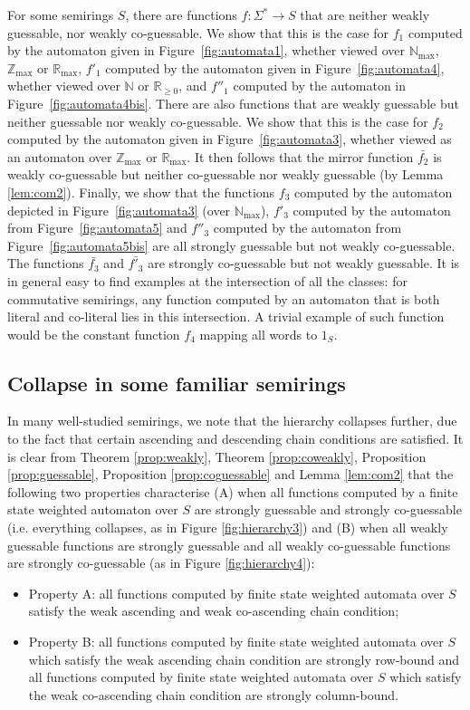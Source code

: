 \documentclass[10pt,a4paper]{amsart}
\theoremstyle{definition}
\numberwithin{equation}{section}
\numberwithin{theorem}{section}
\begin{document}
For some semirings $S$, there are functions $f: \Sigma^* \rightarrow S$ that are neither weakly guessable, nor weakly co-guessable. We show that this is the case for $f_1$ computed by the automaton given in Figure~\ref{fig:automata1}, whether viewed over $\mathbb{N}_{\max}$, $\mathbb{Z}_{\max}$ or $\mathbb{R}_{\max}$, $f'_1$ computed by the automaton given in Figure~\ref{fig:automata4}, whether viewed over $\mathbb{N}$ or $\mathbb{R}_{\geq 0}$, and $f''_1$ computed by the automaton in Figure~\ref{fig:automata4bis}. There are also functions that are weakly guessable but neither guessable nor weakly co-guessable. We show that this is the case for $f_2$ computed by the automaton given in Figure~\ref{fig:automata3}, whether viewed as an automaton over $\mathbb{Z}_{\max}$ or $\mathbb{R}_{\max}$. It then follows that the mirror function $\bar{f_2}$ is weakly co-guessable but neither co-guessable nor weakly guessable (by Lemma \ref{lem:com2}). Finally, we show that the functions $f_3$ computed by the automaton depicted in Figure~\ref{fig:automata3} (over $\mathbb{N}_{\max}$), $f'_3$ computed by the automaton from Figure~\ref{fig:automata5} and $f''_3$ computed by the automaton from Figure~\ref{fig:automata5bis} are all strongly guessable but not weakly co-guessable. The functions $\bar{f_3}$ and $\bar{f'_3}$ are strongly co-guessable but not weakly guessable. 
It is in general easy to find examples at the intersection of all the classes: for commutative semirings, any function computed by an automaton that is both literal and co-literal lies in this intersection. A trivial example of such function would be the constant function $f_4$ mapping all words to $1_S$.

\subsection{Collapse in some familiar semirings}
In many well-studied semirings, we note that the hierarchy collapses further, due to the fact that certain ascending and descending chain conditions are satisfied. It is clear from Theorem \ref{prop:weakly}, Theorem \ref{prop:coweakly}, Proposition \ref{prop:guessable}, Proposition \ref{prop:coguessable} and Lemma \ref{lem:com2} that the following two properties characterise (A) when all functions computed by a finite state weighted automaton over $S$ are strongly guessable and strongly co-guessable (i.e. everything collapses, as in Figure \ref{fig:hierarchy3}) and (B) when all weakly guessable functions are strongly guessable and all weakly co-guessable functions are strongly co-guessable (as in Figure \ref{fig:hierarchy4}):
\begin{itemize}
	\item Property A: all functions computed by finite state weighted automata over $S$ satisfy the weak ascending and weak co-ascending chain condition;
	\item Property B: all functions computed by finite state weighted automata over $S$ which satisfy the weak ascending chain condition are strongly row-bound and all functions computed by finite state weighted automata over $S$ which satisfy the weak co-ascending chain condition are strongly column-bound.
\end{itemize}
\end{document}
